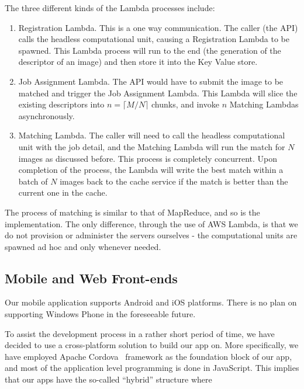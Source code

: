 The three different kinds of the Lambda processes include:

\begin{enumerate}
	\item Registration Lambda. This is a one way communication. The caller (the API) calls the headless computational unit, causing a Registration Lambda to be spawned. This Lambda process will run to the end (the generation of the descriptor of an image) and then store it into the Key Value store.
	\item Job Assignment Lambda. The API would have to submit the image to be matched and trigger the Job Assignment Lambda. This Lambda will slice the existing descriptors into $n=\lceil M / N \rceil$ chunks, and invoke $n$ Matching Lambdas asynchronously.
	\item Matching Lambda. The caller will need to call the headless computational unit with the job detail, and the Matching Lambda will run the match for $N$ images as discussed before. This process is completely concurrent. Upon completion of the process, the Lambda will write the best match within a batch of $N$ images back to the cache service if the match is better than the current one in the cache.
\end{enumerate}

The process of matching is similar to that of MapReduce, and so is the implementation. The only difference, through the use of AWS Lambda, is that we do not provision or administer the servers ourselves - the computational units are spawned ad hoc and only whenever needed.

\subsection{Mobile and Web Front-ends}
Our mobile application supports Android and iOS platforms. There is no plan on supporting Windows Phone in the foreseeable future.

To assist the development process in a rather short period of time, we have decided to use a cross-platform solution to build our app on. More specifically, we have employed Apache Cordova~\cite{cordova} framework as the foundation block of our app, and most of the application level programming is done in JavaScript. This implies that our apps have the so-called ``hybrid'' structure where

